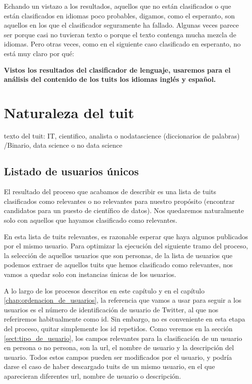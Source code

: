 Echando un vistazo a los resultados, aquellos que no están clasificados o que están
clasificados en idiomas poco probables, digamos, como el esperanto, son aquellos en los
que el clasificador seguramente ha fallado. Algunas veces parece ser porque casi no 
tuvieran texto o porque el texto contenga mucha mezcla de idiomas. Pero otras veces, 
como en el siguiente caso clasificado en esperanto, no está muy claro por qué:



{\bf Vistos los resultados del clasificador de lenguaje, usaremos para el análisis del contenido de los tuits
los idiomas inglés y español.}

\section{Naturaleza del tuit}
\label{sect:tuits_relevantes}
texto del tuit:  IT, cientifico, analista o nodatascience (diccionarios de palabras)
					/Binario, data science o no data science


\subsection{Listado de usuarios únicos}
\label{subsect:duplicados1}

El resultado del proceso que acabamos de describir
es una lista de tuits clasificados como relevantes o no relevantes
para nuestro propósito (encontrar candidatos para un puesto de científico de datos).
Nos quedaremos naturalmente solo con aquellos que hayamos clasificado como relevantes.

En esta lista de tuits relevantes, es razonable esperar que haya algunos 
publicados por el mismo usuario. Para optimizar la ejecución
del siguiente tramo del proceso, la selección de aquellos usuarios que son personas, 
de la lista de usuarios que podemos extraer de aquellos tuits que hemos clasificado como
relevantes, nos vamos a quedar solo con instancias únicas de los usuarios.

A lo largo de los procesos descritos en este capítulo y en el capítulo \ref{chap:ordenacion_de_usuarios},
la referencia que vamos a usar para seguir a los usuarios es el número de identificación 
de usuario de Twitter, al que nos referiremos habitualmente como id.
Sin embargo, no es conveniente en esta etapa del proceso, quitar simplemente los id 
repetidos. Como veremos en la sección \ref{sect:tipo_de_usuario}, los campos relevantes
para la clasificación de un usuario en persona o no persona, son 
la url, el nombre de usuario y la descripción del usuario. Todos estos campos
pueden ser modificados por el usuario, y podría darse el caso de haber descargado
tuits de un mismo usuario, en el que aparecieran diferentes url, nombre de usuario o
descripción.

